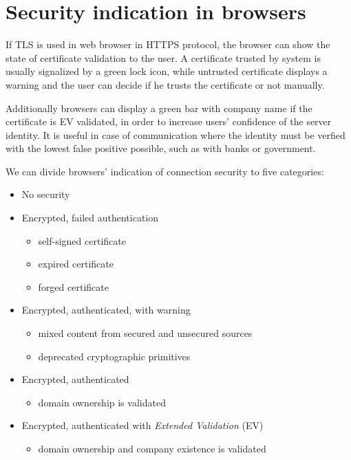 \chapter{Security indication in browsers}
\label{toc/certificate-warnings}

If TLS is used in web browser in HTTPS protocol, the browser can show the state of certificate validation to the user. A certificate trusted by system is usually signalized by a green lock icon, while untrusted certificate displays a warning and the user can decide if he trusts the certificate or not manually.

Additionally browsers can display a green bar with company name if the certificate is EV validated, in order to increase users' confidence of the server identity. It is useful in case of communication where the identity must be verfied with the lowest false positive possible, such as with banks or government.

We can divide browsers' indication of connection security to five categories:

\begin{itemize}
  \item No security
  \item Encrypted, failed authentication
  \begin{itemize}
    \item self-signed certificate
    \item expired certificate
    \item forged certificate
  \end{itemize}
  \item Encrypted, authenticated, with warning
  \begin{itemize}
    \item mixed content from secured and unsecured sources
    \item deprecated cryptographic primitives
  \end{itemize}
  \item Encrypted, authenticated
  \begin{itemize}
    \item domain ownership is validated
  \end{itemize}
  \item Encrypted, authenticated with \textit{Extended Validation} (EV)
  \begin{itemize}
    \item domain ownership and company existence is validated
  \end{itemize}
\end{itemize}


